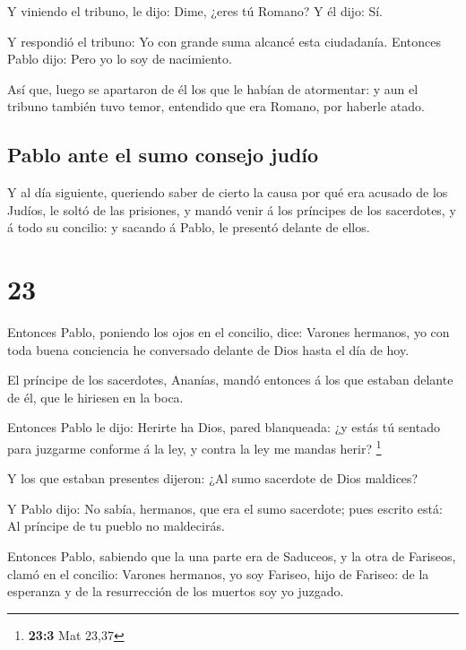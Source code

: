  Y viniendo el tribuno, le dijo: Dime, ¿eres tú Romano? Y
él dijo: Sí.

 Y respondió el tribuno: Yo con grande suma alcancé esta
ciudadanía. Entonces Pablo dijo: Pero yo lo soy de nacimiento.

 Así que, luego se apartaron de él los que le habían de
atormentar: y aun el tribuno también tuvo temor, entendido que era
Romano, por haberle atado.

\hypertarget{pablo-ante-el-sumo-consejo-juduxedo}{%
\subsection{Pablo ante el sumo consejo
judío}\label{pablo-ante-el-sumo-consejo-juduxedo}}

 Y al día siguiente, queriendo saber de cierto la causa
por qué era acusado de los Judíos, le soltó de las prisiones, y mandó
venir á los príncipes de los sacerdotes, y á todo su concilio: y sacando
á Pablo, le presentó delante de ellos.

\hypertarget{section-22}{%
\section{23}\label{section-22}}

 Entonces Pablo, poniendo los ojos en el concilio, dice:
Varones hermanos, yo con toda buena conciencia he conversado delante de
Dios hasta el día de hoy.

 El príncipe de los sacerdotes, Ananías, mandó entonces á
los que estaban delante de él, que le hiriesen en la boca.

 Entonces Pablo le dijo: Herirte ha Dios, pared
blanqueada: ¿y estás tú sentado para juzgarme conforme á la ley, y
contra la ley me mandas herir? \footnote{\textbf{23:3} Mat 23,37}

 Y los que estaban presentes dijeron: ¿Al sumo sacerdote
de Dios maldices?

 Y Pablo dijo: No sabía, hermanos, que era el sumo
sacerdote; pues escrito está: Al príncipe de tu pueblo no maldecirás.

 Entonces Pablo, sabiendo que la una parte era de
Saduceos, y la otra de Fariseos, clamó en el concilio: Varones hermanos,
yo soy Fariseo, hijo de Fariseo: de la esperanza y de la resurrección de
los muertos soy yo juzgado.

